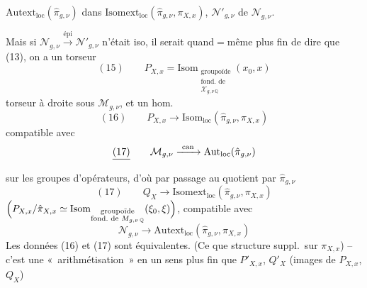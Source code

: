 \documentclass[11pt,a4paper]{article}
\begin{document}
$\mathrm{Autext}_{\mathrm{loc}}(\hat\pi_{g,\nu})$ dans
$\mathrm{Isomext}_{\mathrm{loc}}(\hat\pi_{g,\nu},\pi_{X,x})$, \ill{}
 $\mathcal{N}'_{g,\nu}$  de
$\mathcal{N}_{g,\nu}$.

Mais si $\mathcal{N}_{g,\nu}\xrightarrow{\mathrm{épi}}\mathcal{N}'_{g,\nu}$
n'était  iso, il serait quand${}={}$même plus fin de dire
que  (13), on a un torseur 
\[
  (15)\qquad
  P_{X,x} = \mathrm{Isom}_{\substack{\text{groupoïde}\\ \text{fond.\ de}\\ \mathcal{X}_{g,\nu\,\mathbb{Q}}}}(x_0,x)
\]
torseur à droite sous $\mathcal{M}_{g,\nu}$, et un hom.
\[
  (16)\qquad P_{X,x}\longrightarrow\mathrm{Isom}_{\mathrm{loc}}(\hat\pi_{g,\nu},\pi_{X,x})
\]
compatible avec
\[
  \struck{(17)}\qquad \mathcal{M}_{g,\nu}\xrightarrow{\ \mathrm{can}\ }\mathrm{Aut}_{\mathrm{loc}}(\hat\pi_{g,\nu})
\]
sur les groupes d'opérateurs, d'où par passage au quotient par
$\hat\pi_{g,\nu}$
\[
  (17)\qquad Q_{X}\longrightarrow\mathrm{Isomext}_{\mathrm{loc}}(\hat\pi_{g,\nu},\pi_{X,x})
\]
$\Bigl(P_{X,x}/\hat\pi_{X,x}\simeq\mathrm{Isom}_{\substack{\text{groupoïde}\\ \text{fond.\ de } M_{g,\nu\,\mathbb{Q}}}}(\xi_0,\xi)\Bigr)$,
compatible avec
\[
  \mathcal{N}_{g,\nu}\longrightarrow\mathrm{Autext}_{\mathrm{loc}}(\hat\pi_{g,\nu},\pi_{X,x})
\]
 Les données (16) et (17) sont équivalentes. (Ce \ill{}
que structure suppl.\ sur $\pi_{X,x}$) -- c'est une «~arithmétisation~»
en un sens plus fin que  $P'_{X,x}$, $Q'_{X}$ (images de
$P_{X,x}$, $Q_X$)

\end{document}
